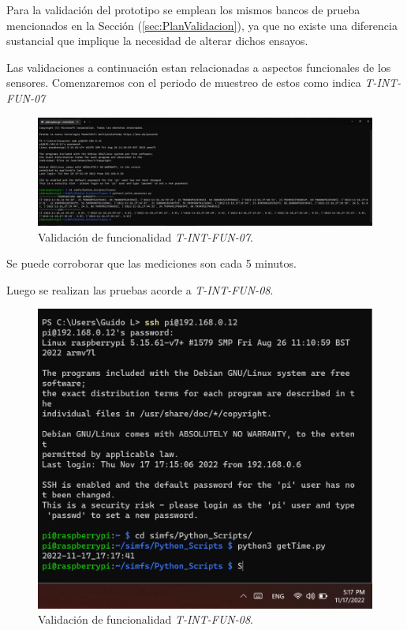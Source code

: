 Para la validación del prototipo se emplean los mismos bancos de prueba mencionados en la Sección (\ref{sec:PlanValidacion}), ya que no existe una diferencia sustancial que implique la necesidad de alterar dichos ensayos.


Las validaciones a continuación estan relacionadas a aspectos funcionales de los sensores.
Comenzaremos con el periodo de muestreo de estos como indica \textit{T-INT-FUN-07}
\begin{figure}[H]
	\centering
    \includegraphics[width=1\linewidth]{ImagenesValidacion del prototipo/T-INT-FUN-07}
	\caption{Validación de funcionalidad \textit{T-INT-FUN-07}.}
\end{figure}
Se puede corroborar que las mediciones son cada 5 minutos.

Luego se realizan las pruebas acorde a \textit{T-INT-FUN-08}.
\begin{figure}[H]
	\centering
    \includegraphics[width=0.8\linewidth]{ImagenesValidacion del prototipo/TINTFUN8}
	\caption{Validación de funcionalidad \textit{T-INT-FUN-08}.}
\end{figure}


